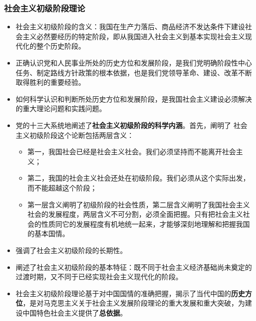 \documentclass[12pt,openany]{ctexbook}
\begin{document}
\subsubsection{社会主义初级阶段理论}
\begin{itemize}
  \item 社会主义初级阶段的含义：我国在生产力落后、商品经济不发达条件下建设社会主义必然要经历的特定阶段，即从我国进入社会主义到基本实现社会主义现代化的整个历史阶段。
  \item 正确认识党和人民事业所处的历史方位和发展阶段，是我们党明确阶段性中心任务、制定路线方针政策的根本依据，也是我们党领导革命、建设、改革不断取得胜利的重要经验。
  \item 如何科学认识和判断所处历史方位和发展阶段，是我国社会主义建设必须解决的重大理论问题和实践问题。
  \item 党的十三大系统地阐述了\textbf{社会主义初级阶段的科学内涵}。首先，阐明了 社会主义初级阶段这个论断包括两层含义：
\begin{itemize}
  \item 第一，我国社会已经是社会主义社会。我们必须坚持而不能离开社会主义；
  \item 第二，我国的社会主义社会还处在初级阶段。我们必须从这个实际出发，而不能超越这个阶段；
  \item 第一层含义阐明了初级阶段的社会性质，第二层含义阐明了我国社会主义社会的发展程度，两层含义不可分割，必须全面把握。只有把社会主义社会的性质同它的发展程度有机地统一起来，才能够深刻地理解和把握我国的基本国情。
\end{itemize}
  \item 强调了社会主义初级阶段的长期性。
  \item 阐述了社会主义初级阶段的基本特征：既不同于社会主义经济基础尚未奠定的过渡时期，又不同于已经实现社会主义现代化的阶段。
  \item 社会主义初级阶段理论基于对中国国情的准确把握，揭示了当代中国的\textbf{历史方位}，是对马克思主义关于社会主义发展阶段理论的重大发展和重大突破，为建设中国特色社会主义提供了\textbf{总依据}。
\end{itemize}
\end{document}
